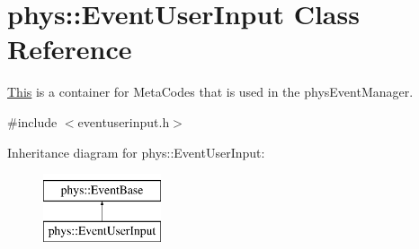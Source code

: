\hypertarget{classphys_1_1EventUserInput}{
\section{phys::EventUserInput Class Reference}
\label{d7/df5/classphys_1_1EventUserInput}
}


\hyperlink{structThis}{This} is a container for MetaCodes that is used in the physEventManager.  




{\ttfamily \#include $<$eventuserinput.h$>$}

Inheritance diagram for phys::EventUserInput:\begin{figure}[H]
\begin{center}
\leavevmode
\includegraphics[height=2cm]{d7/df5/classphys_1_1EventUserInput}
\end{center}
\end{figure}

